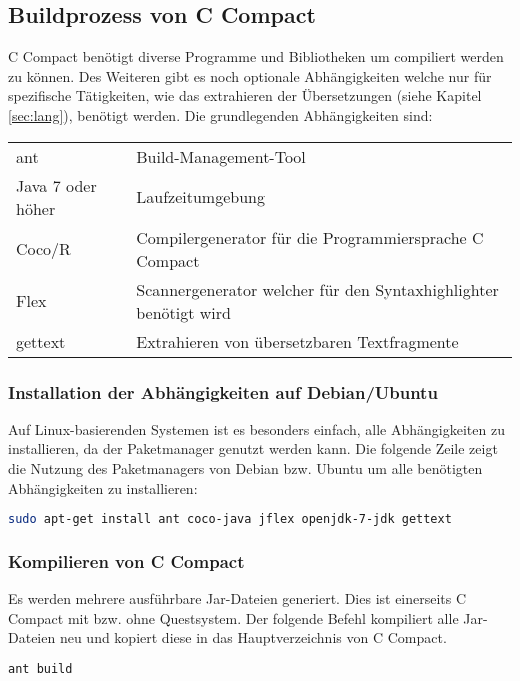 \subsection{Buildprozess von C Compact}

C Compact ben\"otigt diverse Programme und Bibliotheken um compiliert werden zu k\"onnen. Des Weiteren gibt es noch optionale Abh\"angigkeiten welche nur f\"ur spezifische T\"atigkeiten, wie das extrahieren der \"Ubersetzungen (siehe Kapitel \ref{sec:lang}), ben\"otigt werden. Die grundlegenden Abh\"angigkeiten sind:

\begin{tabular}{l | l}
 ant & Build-Management-Tool\\
 Java 7 oder h\"oher & Laufzeitumgebung \\
 Coco/R & Compilergenerator f\"ur die Programmiersprache C Compact\\
 Flex & Scannergenerator welcher f\"ur den Syntaxhighlighter ben\"otigt wird\\
 gettext & Extrahieren von \"ubersetzbaren Textfragmente\\
\end{tabular}

\subsubsection{Installation der Abh\"angigkeiten auf Debian/Ubuntu}

Auf Linux-basierenden Systemen ist es besonders einfach, alle Abh\"angigkeiten zu installieren, da der Paketmanager genutzt werden kann. Die folgende Zeile zeigt die Nutzung des Paketmanagers von Debian bzw. Ubuntu um alle ben\"otigten Abh\"angigkeiten zu installieren:

\begin{lstlisting}[language=bash]
sudo apt-get install ant coco-java jflex openjdk-7-jdk gettext
\end{lstlisting}

\subsubsection{Kompilieren von C Compact}

Es werden mehrere ausf\"uhrbare Jar-Dateien generiert. Dies ist einerseits C Compact mit bzw. ohne Questsystem. Der folgende Befehl kompiliert alle Jar-Dateien neu und kopiert diese in das Hauptverzeichnis von C Compact. 

\begin{lstlisting}[language=bash]
ant build
\end{lstlisting}


